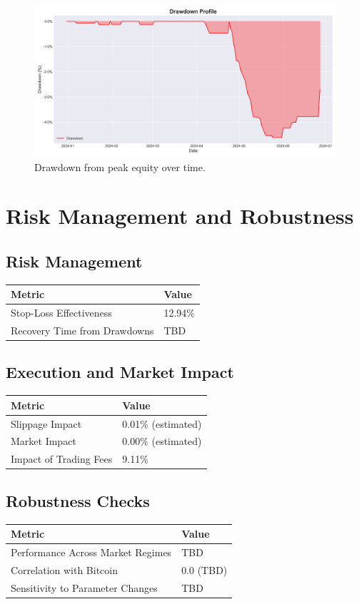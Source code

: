 \documentclass{article}
\begin{document}
\begin{figure}[H]
    \centering
    \includegraphics[width=\textwidth]{drawdown.png}
    \caption{Drawdown from peak equity over time.}
\end{figure}
\newpage

\section{Risk Management and Robustness}
\subsection{Risk Management}
\begin{tabular}{ll}
    \textbf{Metric} & \textbf{Value} \\
    \hline
    Stop-Loss Effectiveness & 12.94\% \\
    Recovery Time from Drawdowns & TBD \\
\end{tabular}

\subsection{Execution and Market Impact}
\begin{tabular}{ll}
    \textbf{Metric} & \textbf{Value} \\
    \hline
    Slippage Impact & 0.01\% (estimated) \\
    Market Impact & 0.00\% (estimated) \\
    Impact of Trading Fees & 9.11\% \\
\end{tabular}

\subsection{Robustness Checks}
\begin{tabular}{ll}
    \textbf{Metric} & \textbf{Value} \\
    \hline
    Performance Across Market Regimes & TBD \\
    Correlation with Bitcoin & 0.0 (TBD) \\
    Sensitivity to Parameter Changes & TBD \\
\end{tabular}
\end{document}

